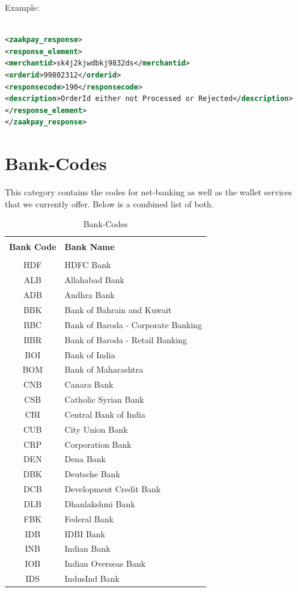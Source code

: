 \documentclass{article}
\begin{document}
Example:

\begin{lstlisting}[language=xml,breaklines=true]

<zaakpay_response>
<response_element>
<merchantid>sk4j2kjwdbkj9832ds</merchantid>
<orderid>99802312</orderid>
<responsecode>190</responsecode>
<description>OrderId either not Processed or Rejected</description>
</response_element>
</zaakpay_response>
\end{lstlisting}

\newpage
\section{Bank-Codes}This category contains 
the codes for net-banking as well as the wallet services that we currently offer. Below is a combined list of both.
\begin{longtable}{||c|p{12.5cm}||}
\rowcolor{white}
\caption{Bank-Codes}\\
   \rowcolor{green!50}
\bfseries{Bank Code} & \bfseries{Bank Name} \\ \hline  & \\
HDF & HDFC Bank\\
ALB & Allahabad Bank\\
ADB & Andhra Bank\\
BBK & Bank of Bahrain and Kuwait\\
BBC & Bank of Baroda - Corporate Banking\\
BBR & Bank of Baroda - Retail Banking\\
BOI & Bank of India\\
BOM & Bank of Maharashtra\\
CNB & Canara Bank\\
CSB & Catholic Syrian Bank\\
CBI & Central Bank of India\\
CUB & City Union Bank\\
CRP & Corporation Bank\\
DEN & Dena Bank\\
DBK & Deutsche Bank\\
DCB & Development Credit Bank\\
DLB & Dhanlakshmi Bank\\
FBK & Federal Bank\\
IDB & IDBI Bank\\
INB & Indian Bank\\
IOB & Indian Overseas Bank\\
IDS & IndusInd Bank\\

\end{longtable}
\end{document}
